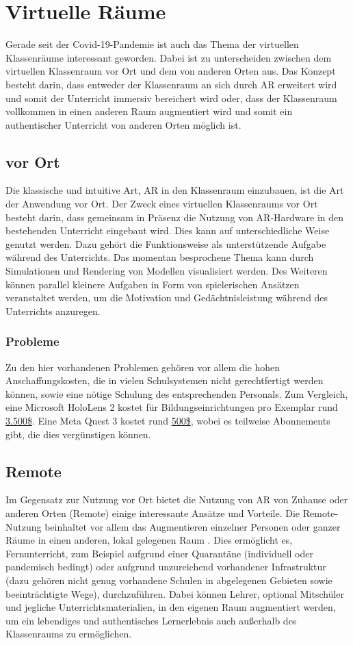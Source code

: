 \documentclass[conference]{IEEEtran}
\begin{document}
\section{Virtuelle Räume}
Gerade seit der Covid-19-Pandemie ist auch das Thema der virtuellen Klassenräume interessant geworden.
Dabei ist zu unterscheiden zwischen dem virtuellen Klassenraum vor Ort und dem von anderen Orten aus.
Das Konzept besteht darin, dass entweder der Klassenraum an sich durch AR erweitert wird und somit der Unterricht
immersiv bereichert wird oder, dass der Klassenraum vollkommen in einen anderen Raum augmentiert wird und somit
ein authentischer Unterricht von anderen Orten möglich ist.

\subsection{vor Ort}
Die klassische und intuitive Art, AR in den Klassenraum einzubauen, ist die Art der Anwendung vor Ort.
Der Zweck eines virtuellen Klassenraums vor Ort besteht darin, dass gemeinsam in Präsenz die Nutzung von AR-Hardware in den bestehenden Unterricht eingebaut wird. 
Dies kann auf unterschiedliche Weise genutzt werden. Dazu gehört die Funktionsweise 
als unterstützende Aufgabe während des Unterrichts. Das momentan besprochene Thema kann durch Simulationen und Rendering von Modellen visualisiert werden. 
Des Weiteren können parallel kleinere Aufgaben in Form von spielerischen Ansätzen veranstaltet werden,
um die Motivation und Gedächtnisleistung während des Unterrichts anzuregen.
\subsubsection*{Probleme}
Zu den hier vorhandenen Problemen gehören vor allem die hohen Anschaffungskosten, die in vielen Schulsystemen nicht gerechtfertigt
werden können, sowie eine nötige Schulung des entsprechenden Personals. Zum Vergleich, eine Microsoft HoloLens 2 kostet für Bildungseinrichtungen
pro Exemplar rund \href{https://techcommunity.microsoft.com/t5/mixed-reality-blog/education-institutions-save-10-on-microsoft-hololens-2/ba-p/3282493}{3.500\$}.
Eine Meta Quest 3 kostet rund \href{https://www.meta.com/de/en/quest/quest-3/#}{500\$}, wobei es teilweise Abonnements gibt, die dies vergünstigen können.
\subsection{Remote}
Im Gegensatz zur Nutzung vor Ort bietet die Nutzung von AR von Zuhause oder anderen Orten (Remote) einige interessante Ansätze und Vorteile. 
Die Remote-Nutzung beinhaltet vor allem das Augmentieren einzelner Personen oder ganzer Räume in einen anderen, lokal gelegenen Raum \cite{b5}. Dies ermöglicht es, Fernunterricht, zum Beispiel aufgrund einer Quarantäne (individuell oder pandemisch bedingt)
oder aufgrund unzureichend vorhandener Infrastruktur (dazu gehören nicht genug vorhandene Schulen in abgelegenen Gebieten sowie 
beeinträchtigte Wege), durchzuführen. Dabei können Lehrer, optional Mitschüler und jegliche Unterrichtsmaterialien, in den eigenen Raum 
augmentiert werden, um ein lebendiges und authentisches Lernerlebnis auch außerhalb des Klassenraums zu ermöglichen.
\end{document}
